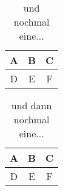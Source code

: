 \documentclass[a4paper,
11pt,
BCOR10.00mm,
oneside,
DIV10,
headinclude,footinclude=false
]{scrbook}
\begin{document}
\begin{table}
        \centering
        \caption{und nochmal eine...}
        \label{einTab3}
                \begin{tabular}{ccc}
                \toprule
                        A & B & C \\
                \midrule
                        D & E & F \\
                \bottomrule        
                \end{tabular}
\end{table}

\begin{table}
        \centering
        \caption{und dann nochmal eine...}
        \label{einTab4}
                \begin{tabular}{ccc}
                \toprule
                        A & B & C \\
                \midrule
                        D & E & F \\
                \bottomrule        
                \end{tabular}
\end{table}
\end{document}
